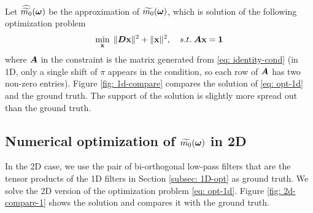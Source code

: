 Let $\widehat{\widetilde{m_{0}}}(\boldsymbol{\omega})$ be the approximation of $\widetilde{m_{0}}(\boldsymbol{\omega})$, which is solution of the following optimization problem
\begin{align}
\min_{\mathbf{x}}\; \Vert \boldsymbol{D}\mathbf{x}\Vert^2 + \Vert \mathbf{x}\Vert^2,\quad s.t. \; \boldsymbol{A}\mathbf{x} = \mathbf{1} \label{eq: opt-1d}
\end{align}
where $\boldsymbol{A}$ in the constraint is the matrix generated from \eqref{eq: identity-cond} (in 1D, only a single shift of $\pi$ appears in the condition, so each row of $\boldsymbol{A}$ has two non-zero entries). 
Figure \ref{fig: 1d-compare} compares the solution of \eqref{eq: opt-1d} and the ground truth. The support of the solution is slightly more spread out than the ground truth.

\subsection{Numerical optimization of $\widetilde{m_{0}}(\boldsymbol{\omega})$ in 2D}
In the 2D case, we use the pair of bi-orthogonal low-pass filters that are the tensor products of the 1D filters in Section \ref{subsec: 1D-opt} as ground truth. We solve the 2D version of the optimization problem \eqref{eq: opt-1d}. Figure \ref{fig: 2d-compare-1} shows the solution and compares it with the ground truth. 



